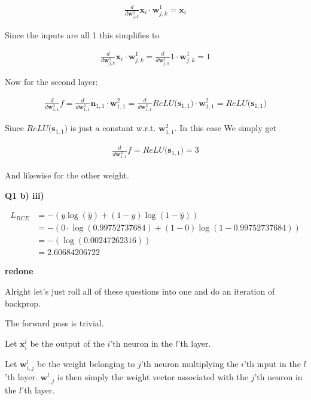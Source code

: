 \documentclass{article}
\begin{document}
	\begin{align}
		\frac{d }{d \mathbf{w}^1_{j, k}} \mathbf{x}_i\cdot\mathbf{w}^1_{j, k} = \mathbf{x}_i
	\end{align}
	
	Since the inputs are all 1 this simplifies to 

	\begin{align}
		\frac{d }{d \mathbf{w}^1_{j, k}} \mathbf{x}_i\cdot\mathbf{w}^1_{j, k} = \frac{d }{d \mathbf{w}^1_{j, k}} 1\cdot\mathbf{w}^1_{j, k} = 1
	\end{align}
	
	Now for the second layer:
	
	\begin{align}
		\frac{d}{d \mathbf{w}^2_{1, 1}} f = \frac{d}{d \mathbf{w}^2_{1, 1}} \mathbf{n}_{1, 1}\cdot\mathbf{w}^2_{1, 1} = \frac{d}{d \mathbf{w}^2_{1, 1}} ReLU\big(\mathbf{s}_{1, 1}\big)\cdot\mathbf{w}^2_{1, 1} = ReLU\big(\mathbf{s}_{1, 1}\big)
	\end{align}
	
	Since $ReLU\big(\mathbf{s}_{1, 1}\big)$ is just a constant w.r.t. $\mathbf{w}^2_{1, 1}$. In this case We simply get
	
	\begin{align}
		\frac{d}{d \mathbf{w}^2_{1, 1}} f = ReLU\big(\mathbf{s}_{1, 1}\big) = 3
	\end{align}
	
	And likewise for the other weight.
	
\textbf{Q1 b) iii)}

	\begin{align}
		L_{BCE} &= -(y\log(\hat{y}) + (1-y)\log(1-\hat{y}))\\
		&= -(0\cdot\log(0.99752737684) + (1-0)\log(1-0.99752737684))\\
		&= -(\log(0.00247262316))\\
		&= 2.60684206722
	\end{align}
	
\textbf{redone}

	Alright let's just roll all of these questions into one and do an iteration of backprop.
	
	The forward pass is trivial.
	
	Let $\mathbf{x}^{l}_i$ be the output of the $i$'th neuron in the $l$'th layer. 
	
	Let $\mathbf{w}^l_{i, j}$ be the weight belonging to $j$'th neuron multiplying the $i$'th input in the $l$'th layer.  $\mathbf{w}^l_{.,j}$ is then simply the weight vector associated with the $j$'th neuron in the $l$'th layer.
	
\end{document}
